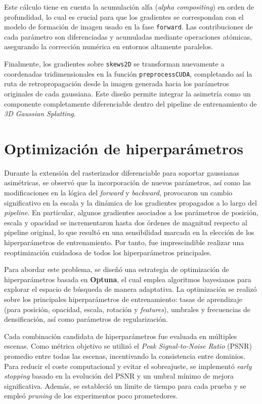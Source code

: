 Este cálculo tiene en cuenta la acumulación alfa (\textit{alpha compositing}) en orden de profundidad, lo cual es crucial para que los gradientes se correspondan con el modelo de formación de imagen usado en la fase \texttt{forward}. Las contribuciones de cada parámetro son diferenciadas y acumuladas mediante operaciones atómicas, asegurando la corrección numérica en entornos altamente paralelos.

Finalmente, los gradientes sobre \texttt{skews2D} se transforman nuevamente a coordenadas tridimensionales en la función \texttt{preprocessCUDA}, completando así la ruta de retropropagación desde la imagen generada hacia los parámetros originales de cada gaussiana. Este diseño permite integrar la asimetría como un componente completamente diferenciable dentro del pipeline de entrenamiento de \textit{3D Gaussian Splatting}.

\section{Optimización de hiperparámetros}
\label{sec:hyperopt}

Durante la extensión del rasterizador diferenciable para soportar gaussianas asimétricas, se observó que la incorporación de nuevos parámetros, así como las modificaciones en la lógica del \textit{forward} y \textit{backward}, provocaron un cambio significativo en la escala y la dinámica de los gradientes propagados a lo largo del \textit{pipeline}. En particular, algunos gradientes asociados a los parámetros de posición, escala y opacidad se incrementaron hasta dos órdenes de magnitud respecto al pipeline original, lo que resultó en una sensibilidad marcada en la elección de los hiperparámetros de entrenamiento. Por tanto, fue imprescindible realizar una reoptimización cuidadosa de todos los hiperparámetros principales.

Para abordar este problema, se diseñó una estrategia de optimización de hiperparámetros basada en \textbf{Optuna}, el cual emplea algoritmos bayesianos para explorar el espacio de búsqueda de manera adaptativa. La optimización se realizó sobre los principales hiperparámetros de entrenamiento: tasas de aprendizaje (para posición, opacidad, escala, rotación y \textit{features}), umbrales y frecuencias de densificación, así como parámetros de regularización. 

Cada combinación candidata de hiperparámetros fue evaluada en múltiples escenas. Como métrica objetivo se utilizó el \textit{Peak Signal-to-Noise Ratio} (PSNR) promedio entre todas las escenas, incentivando la consistencia entre dominios. Para reducir el coste computacional y evitar el sobreajuste, se implementó \textit{early stopping} basado en la evolución del PSNR y un umbral mínimo de mejora significativa. Además, se estableció un límite de tiempo para cada prueba y se empleó \textit{pruning} de los experimentos poco prometedores.

